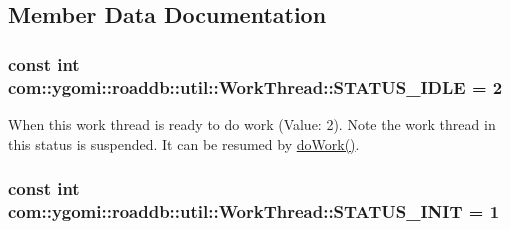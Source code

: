 \subsection{Member Data Documentation}
\hypertarget{classcom_1_1ygomi_1_1roaddb_1_1util_1_1WorkThread_ad6bc7481694d9df02ebcd1b827abb755}{
\subsubsection[{S\-T\-A\-T\-U\-S\-\_\-\-I\-D\-L\-E}]{\setlength{\rightskip}{0pt plus 5cm}const int com\-::ygomi\-::roaddb\-::util\-::\-Work\-Thread\-::\-S\-T\-A\-T\-U\-S\-\_\-\-I\-D\-L\-E = 2\hspace{0.3cm}{\ttfamily [static]}}}\label{classcom_1_1ygomi_1_1roaddb_1_1util_1_1WorkThread_ad6bc7481694d9df02ebcd1b827abb755}
When this work thread is ready to do work (Value\-: 2). Note the work thread in this status is suspended. It can be resumed by \hyperlink{classcom_1_1ygomi_1_1roaddb_1_1util_1_1WorkThread_afadf70a2f873ad2a5119c98467e8cc19}{do\-Work()}. \hypertarget{classcom_1_1ygomi_1_1roaddb_1_1util_1_1WorkThread_a327f2a2fcfd8a63f1684e6a7f4139558}{
\subsubsection[{S\-T\-A\-T\-U\-S\-\_\-\-I\-N\-I\-T}]{\setlength{\rightskip}{0pt plus 5cm}const int com\-::ygomi\-::roaddb\-::util\-::\-Work\-Thread\-::\-S\-T\-A\-T\-U\-S\-\_\-\-I\-N\-I\-T = 1\hspace{0.3cm}{\ttfamily [static]}}}\label{classcom_1_1ygomi_1_1roaddb_1_1util_1_1WorkThread_a327f2a2fcfd8a63f1684e6a7f4139558}
